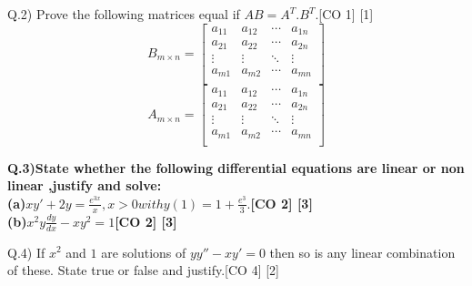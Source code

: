 \documentclass[12pt]{article}
\begin{document}
				
				
				
		\begin{flushleft}
			
			Q.2) Prove the following matrices equal if $AB = A^T.B^T$.\hspace{1cm}[CO 1] [1]\\ 
			\[
			B_{m\times n} =
			\left[ {\begin{array}{cccc}
					a_{11} & a_{12} & \cdots & a_{1n}\\
					a_{21} & a_{22} & \cdots & a_{2n}\\
					\vdots & \vdots & \ddots & \vdots\\
					a_{m1} & a_{m2} & \cdots & a_{mn}\\
			\end{array} } \right]
			\]\[
			A_{m\times n} =
			\left[ {\begin{array}{cccc}
					a_{11} & a_{12} & \cdots & a_{1n}\\
					a_{21} & a_{22} & \cdots & a_{2n}\\
					\vdots & \vdots & \ddots & \vdots\\
					a_{m1} & a_{m2} & \cdots & a_{mn}\\
			\end{array} } \right]
			\]
		\end{flushleft}
				
		\begin{flushleft}
			\bfseries
			Q.3)State whether the following differential equations are linear or non linear ,justify and solve:\\[10pt]
			\normalfont
			\hspace{1cm}(a)$xy'+2y = \frac{e^{3x}}{x}, x>0 with y(1)=1+\frac{e^3}{3}. $\hspace{2.5cm}[CO 2] [3]\\[6 pt]
				\hspace{1cm}(b)$x^2y\frac{dy}{dx}- xy^2 = 1$\hspace{6.5cm}[CO 2] [3]
				\end{flushleft}
								
				\begin{flushleft}
					Q.4) If $x^2$ and $1$ are solutions of $yy''-xy'=0$ then so is any linear combination of these. State true or false and justify.\hspace{2cm}[CO 4] [2]
				\end{flushleft}
								
\end{document}
